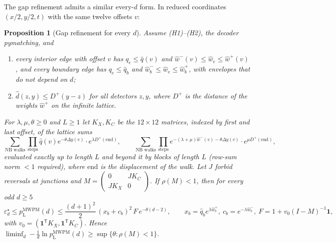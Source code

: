 \documentclass[11pt]{article}
\theoremstyle{plain}
\newtheorem{proposition}{Proposition}
\theoremstyle{definition}
\theoremstyle{remark}
\newcommand{\pM}{p_{\mathrm{L}}^{\mathrm{MWPM}}}
\newcommand{\err}{\varepsilon^{\star}}
\newcommand{\hw}{\hat w}
\newcommand{\hd}{\hat d}
\newcommand{\one}{\mathbf 1}
\renewcommand{\_}{\oldunderscore\allowbreak}
\begin{document}
The gap refinement admits a similar every-$d$ form. In reduced coordinates $(x/2,y/2,t)$ with the same twelve offsets $v$:

\begin{proposition}[Gap refinement for every $d$]\label{prop:lattice-gap}
Assume (H1)--(H2), the decoder pymatching, and
\begin{enumerate}[label=(A\arabic*),leftmargin=*]
\item every interior edge with offset $v$ has $q_e\le\hat q(v)$ and $\hat w^-(v)\le\hw_e\le\hat w^+(v)$, and every boundary edge has $q_e\le\hat q_b$ and $\hat w_b^-\le\hw_e\le\hat w_b^+$, with envelopes that do not depend on $d$;
\item $\hd(z,y)\le D^+(y-z)$ for all detectors $z,y$, where $D^+$ is the distance of the weights $\hat w^+$ on the infinite lattice.
\end{enumerate}
For $\lambda,\mu,\theta\ge0$ and $L\ge1$ let $K_X,K_C$ be the $12\times12$ matrices, indexed by first and last offset, of the lattice sums
\[
\sum_{\text{NB walks}}\prod_{\text{steps}}\hat q(v)e^{-\theta\Delta y(v)}\cdot e^{\lambda D^+(\mathrm{end})},\qquad
\sum_{\text{NB walks}}\prod_{\text{steps}}e^{-(\lambda+\mu)\hat w^-(v)-\theta\Delta y(v)}\cdot e^{\mu D^+(\mathrm{end})},
\]
evaluated exactly up to length $L$ and beyond it by blocks of length $L$ (row-sum norm $<1$ required), where $\mathrm{end}$ is the displacement of the walk. Let $J$ forbid reversals at junctions and $M=\begin{pmatrix}0&JK_C\\JK_X&0\end{pmatrix}$. If $\rho(M)<1$, then for every odd $d\ge5$
\[
\err_d\le\pM(d)\le\frac{(d+1)^2}{2}\,(x_b+c_b)^2\,F\,e^{-\theta(d-2)},\qquad x_b=\hat q_be^{\lambda\hat w_b^+},\ c_b=e^{-\lambda\hat w_b^-},\ F=1+v_0(I-M)^{-1}\one,
\]
with $v_0=(\one^{\mathsf T}K_X,\one^{\mathsf T}K_C)$. Hence $\liminf_d-\frac1d\ln\pM(d)\ge\sup\{\theta:\rho(M)<1\}$.
\end{proposition}
\end{document}
